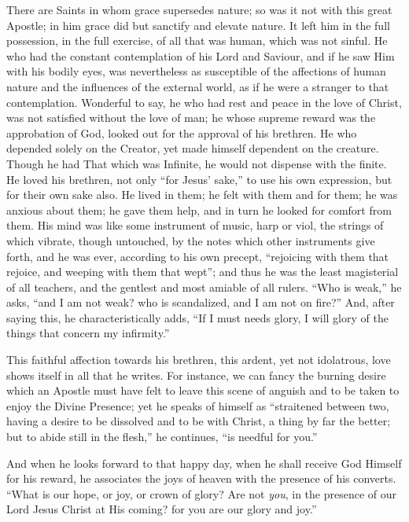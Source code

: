 There are Saints in whom grace supersedes nature; so was it not with this great Apostle; in him grace did but
sanctify and elevate nature. It left him in the full
possession, in the full exercise, of all that was human,
which was not sinful. He who had the constant
contemplation of his Lord and Saviour, and if he saw Him
with his bodily eyes, was nevertheless as susceptible of
the affections of human nature and the influences of the
external world, as if he were a stranger to that
contemplation. Wonderful to say, he who had rest and
peace in the love of Christ, was not satisfied without
the love of man; he whose supreme reward was the
approbation of God, looked out for the approval of his
brethren. He who depended solely on the Creator, yet made
himself dependent on the creature. Though he had That
which was Infinite, he would not dispense with the
finite. He loved his brethren, not only ``for Jesus'
sake,'' to use his own expression, but for their own
sake also. He lived in them; he felt with them and for
them; he was anxious about them; he gave them help, and
in turn he looked for comfort from them. His mind was
like some instrument of music, harp or viol, the strings
of which vibrate, though untouched, by the notes which
other instruments give forth, and he was ever, according
to his own precept, ``rejoicing with them that
rejoice, and weeping with them that wept''; and thus
he was the least magisterial of all teachers, and the
gentlest and most amiable of all rulers. ``Who is
weak,'' he asks, ``and I am not weak? who is
scandalized, and I am not on fire?'' And, after
saying this, he characteristically adds, ``If I must
needs glory, I will glory of the things that concern my
infirmity.''

This faithful affection towards his brethren, this
ardent, yet not idolatrous, love shows itself in all that
he writes. For instance, we can fancy the burning desire
which an Apostle must have felt to leave this scene of
anguish and to be taken to enjoy the Divine Presence; yet
he speaks of himself as ``straitened between two,
having a desire to be dissolved and to be with Christ, a
thing by far the better; but to abide still in the
flesh,'' he continues, ``is needful for
you.''

And when he looks forward to that happy day, when he
shall receive God Himself for his reward, he associates
the joys of heaven with the presence of his converts.
``What is our hope, or joy, or crown of glory? Are
not \emph{you}, in the presence of our Lord Jesus Christ
at His coming? for you are our glory and joy.''

